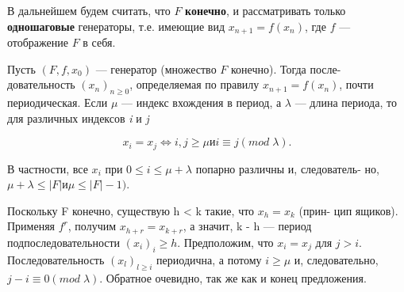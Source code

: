 \documentclass{../template/mai_book}
\begin{document}

\noindent В дальнейшем будем считать, что $F$ \textbf{конечно}, и рассматривать только \linebreak \textbf{одношаговые} генераторы, т.е. имеющие вид $x_{n+1} = f(x_{n})$, где $f$ --- \linebreak отображение $F$ в себя. \par 
\begin{predl}
Пусть $(F,f,x_{0})$ --- генератор (множество $F$ конечно). Тогда после- \linebreak довательность $(x_{n})_{n \geqslant 0}$, определяемая по правилу $x_{n+1} = f(x_{n})$, почти \linebreak периодическая. Если $\mu$ --- индекс вхождения в период, а $\lambda$ --- длина \linebreak периода, то для различных индексов \textit{i} и \textit{j} \par

$$x_{i}=x_{j} \Longleftrightarrow \textit{i},\textit{j} \geqslant \mu и \textit{i}\equiv\textit{j} (mod \; \lambda).$$ \par 
\noindent В частности, все $x_{\textit{i}}$ при $0 \leqslant\textit{i} \leq \mu + \lambda$ попарно различны и, следователь- \linebreak но, $\mu + \lambda \leqslant|F| и \mu \leqslant|F| - 1)$. \par 
\end{predl}
\begin{myproof}
Поскольку F конечно, существую h < k такие, что $x_{h} = x_{k}$ (прин- \linebreak \indent цип ящиков). Применяя $f^{r}$, получим $x_{h+r} = x_{k+r}$, а значит, k - h --- \linebreak \indent период подпоследовательности $(x_{i})_{i}\geqslant h$. Предположим, что $x_{i} = x_{j}$ \linebreak \indent  для $j > i$. Последовательность $(x_{l})_{l \geqslant i}$ периодична, а потому $i \geqslant \mu$ и, \linebreak \indent следовательно, $j - i \equiv 0 (mod \; \lambda)$. Обратное очевидно, так же как и \linebreak \indent конец предложения. \par 
\end{myproof}
\begin{figure}[h]
\end{figure}
\end{document}
